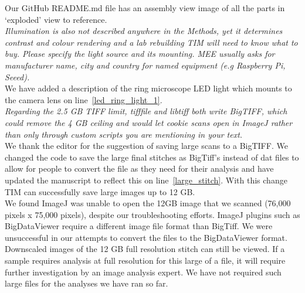 \documentclass[12pt,a4paper]{article}
\newcommand{\lr}[1]{line~\ref{#1}}
\begin{document}
Our GitHub README.md file has an assembly view image of all the parts in `exploded' view to reference. \\

\emph{Illumination is also not described anywhere in the Methods, yet it determines contrast and colour rendering and a lab rebuilding TIM will need to know what to buy. Please specify the light source and its mounting. MEE usually asks for manufacturer name, city and country for named equipment (e.g Raspberry Pi, Seeed).} \\

We have added a description of the ring microscope LED light which mounts to the camera lens on \lr{led_ring_light_1}. \\


\emph{Regarding the 2.5 GB TIFF limit, tifffile and libtiff both write BigTIFF, which could remove the 4 GB ceiling and would let cookie scans open in ImageJ rather than only through custom scripts you are mentioning in your text.} \\

We thank the editor for the suggestion of saving large scans to a BigTIFF. We changed the code to save the large final stitches as BigTiff's instead of dat files to allow for people to convert the file as they need for their analysis and have updated the manuscript to reflect this on \lr{large_stitch}. With this change TIM can successfully save large images up to 12 GB. \\

We found ImageJ was unable to open the 12GB image that we scanned (76,000 pixels x 75,000 pixels), despite our troubleshooting efforts. ImageJ plugins such as BigDataViewer require a different image file format than BigTiff. We were unsuccessful in our attempts to convert the files to the BigDataViewer format. Downscaled images of the 12 GB full resolution stitch can still be viewed. If a sample requires analysis at full resolution for this large of a file, it will require further investigation by an image analysis expert. We have not required such large files for the analyses we have ran so far. \\  



\end{document}

